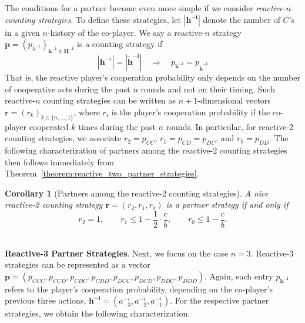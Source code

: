 \documentclass[11pt]{article}
\theoremstyle{plainCl1}
\newtheorem{corollary}{Corollary}
\theoremstyle{plainCl2}
\begin{document}
The conditions for a partner become even more simple if we consider {\it reactive-$n$ counting strategies}. To define these strategies, let $|\mathbf{h^{-i}}|$ denote the number of $C$'s in a given $n$-history of the co-player. We say a reactive-$n$ strategy $\mathbf{p}\!=\!(p_{h^{-i}})_{\mathbf{h^{-i}\in H^{-i}}}$ is a counting strategy if 
\begin{equation}
|\mathbf{h}^{-i}|\! =\! |\mathbf{\tilde h^{-i}}| \quad \Rightarrow \quad p_\mathbf{h^{-i}} = p_\mathbf{\tilde h^{-i}}
\end{equation} 
That is, the reactive player's cooperation probability only depends on the number of cooperative acts during the past $n$ rounds and not on their timing. 
Such reactive-$n$ counting strategies can be written as $n\!+\!1$-dimensional vectors $\mathbf{r}\!=\!(r_k)_{k\in\{n,\ldots,1\}}$, where $r_i$ is the player's cooperation probability if the co-player cooperated $k$ times during the past $n$ rounds. In particular, for reactive-2 counting strategies, we associate $r_2\!=\!p_{CC}$, $r_1\!=\!p_{CD}\!=\!p_{DC}$, and $r_0\!=\!p_{DD}$. 
The following characterization of partners among the reactive-2 counting strategies then follows immediately from Theorem~\ref{theorem:reactive_two_partner_strategies}. 

\begin{corollary}[Partners among the reactive-2 counting strategies]
\label{Cor:PartnersCountingTwo} 
A nice reactive-2 counting strategy $\mathbf{r} = (r_2, r_1, r_0)$ is a partner strategy if and only if
\begin{equation}\label{eq:counting_two_bit_conditions}
 r_2 \!=\! 1, \qquad r_1 \!\le\! 1\!-\!\frac{1}{2} \cdot \frac{c}{b}, \qquad r_0 \!\le\! 1\!-\! \frac{c}{b}.
\end{equation}
\end{corollary}
 ~\\


\noindent
{\bf Reactive-3 Partner Strategies}.
Next, we focus on the case $n\!=\!3$. Reactive-3 strategies can be represented as a vector 
$\mathbf{p}=(p_{CCC}, p_{CCD}, p_{CDC}, p_{CDD}, p_{DCC}, p_{DCD}, p_{DDC}, p_{DDD})$.
Again, each entry $p_\mathbf{h^{-i}}$ refers to the player's cooperation probability, depending on the co-player's previous three actions, $\mathbf{h^{-i}}\!=\!(a^{-i}_{-3}, a^{-i}_{-2}, a^{-i}_{-1})$.
For the respective partner strategies, we obtain the following characterization. 
\end{document}
